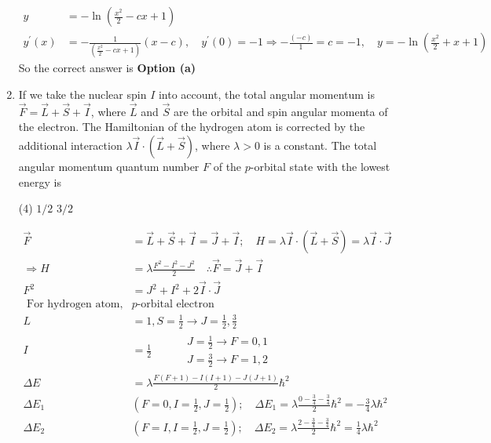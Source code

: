 \begin{enumerate}
\begin{answer}
\begin{align*}
	y&=-\ln \left(\frac{x^{2}}{2}-c x+1\right) \\
	y^{\prime}(x)&=-\frac{1}{\left(\frac{x^{2}}{2}-c x+1\right)}(x-c), \quad y^{\prime}(0)=-1 \Rightarrow-\frac{(-c)}{1}=c=-1, \quad y=-\ln \left(\frac{x^{2}}{2}+x+1\right)
	\end{align*}
	So the correct answer is \textbf{Option (a)}
\end{answer}
\item  If we take the nuclear spin $I$ into account, the total angular momentum is $\vec{F}=\vec{L}+\vec{S}+\vec{I}$, where $\vec{L}$ and $\vec{S}$ are the orbital and spin angular momenta of the electron. The Hamiltonian of the hydrogen atom is corrected by the additional interaction $\lambda \vec{I} \cdot(\vec{L}+\vec{S})$, where $\lambda>0$ is a constant. The total angular momentum quantum number $F$ of the $p$-orbital state with the lowest energy is
 \begin{tasks}(4)
	\task[\textbf{c.}]$1 / 2$
	\task[\textbf{d.}] $3 / 2$
\end{tasks}
\begin{answer}
	\begin{align*}
	\vec{F}&=\vec{L}+\vec{S}+\vec{I}=\vec{J}+\vec{I} ; \quad H=\lambda \vec{I} \cdot(\vec{L}+\vec{S})=\lambda \vec{I} \cdot \vec{J}\\
	\Rightarrow H&=\lambda \frac{F^{2}-I^{2}-J^{2}}{2} \quad \therefore \vec{F}=\vec{J}+\vec{I}\\
	F^{2}&=J^{2}+I^{2}+2 \vec{I} \cdot \vec{J}\\
	\text { For hydrogen atom, } &p \text {-orbital electron }\\
	L&=1, S=\frac{1}{2} \rightarrow J=\frac{1}{2}, \frac{3}{2}\\
	I&=\frac{1}{2}\qquad \begin{aligned}
	&J=\frac{1}{2} \rightarrow F=0,1 \\
	&J=\frac{3}{2} \rightarrow F=1,2
	\end{aligned}\\
	\Delta E&=\lambda \frac{F(F+1)-I(I+1)-J(J+1)}{2} \hbar^{2} \\
	\Delta E_{1}&\left(F=0, I=\frac{1}{2}, J=\frac{1}{2}\right) ; \quad \Delta E_{1}=\lambda \frac{0-\frac{3}{4}-\frac{3}{4}}{2} \hbar^{2}=-\frac{3}{4} \lambda \hbar^{2}\\
	\Delta E_{2}&\left(F=I, I=\frac{1}{2}, J=\frac{1}{2}\right) ; \quad \Delta E_{2}=\lambda \frac{2-\frac{3}{4}-\frac{3}{4}}{2} \hbar^{2}=\frac{1}{4} \lambda \hbar^{2} \\

\end{align*}
\end{answer}
\end{enumerate}
